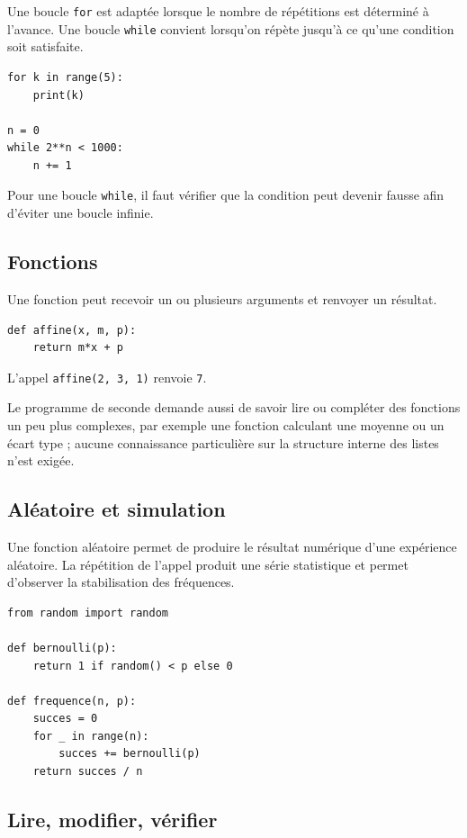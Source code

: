 Une boucle \texttt{for} est adaptée lorsque le nombre de répétitions est déterminé à l'avance. Une boucle \texttt{while} convient lorsqu'on répète jusqu'à ce qu'une condition soit satisfaite.

\begin{verbatim}
for k in range(5):
    print(k)

n = 0
while 2**n < 1000:
    n += 1
\end{verbatim}

Pour une boucle \texttt{while}, il faut vérifier que la condition peut devenir fausse afin d'éviter une boucle infinie.

\subsection{Fonctions}

Une fonction peut recevoir un ou plusieurs arguments et renvoyer un résultat.

\begin{verbatim}
def affine(x, m, p):
    return m*x + p
\end{verbatim}

L'appel \texttt{affine(2, 3, 1)} renvoie \texttt{7}.

Le programme de seconde demande aussi de savoir lire ou compléter des fonctions un peu plus complexes, par exemple une fonction calculant une moyenne ou un écart type ; aucune connaissance particulière sur la structure interne des listes n'est exigée.

\subsection{Aléatoire et simulation}

Une fonction aléatoire permet de produire le résultat numérique d'une expérience aléatoire. La répétition de l'appel produit une série statistique et permet d'observer la stabilisation des fréquences.

\begin{verbatim}
from random import random

def bernoulli(p):
    return 1 if random() < p else 0

def frequence(n, p):
    succes = 0
    for _ in range(n):
        succes += bernoulli(p)
    return succes / n
\end{verbatim}

\subsection{Lire, modifier, vérifier}

